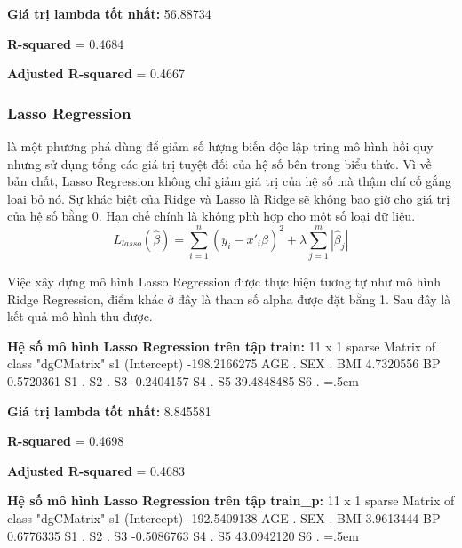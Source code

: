 \documentclass[runningheads]{llncs}
\newenvironment{lcverbatim}
 {\SaveVerbatim{cverb}}
 {\endSaveVerbatim
  \flushleft\fboxrule=0pt\fboxsep=.5em
  \colorbox{cverbbg}{%
    \makebox[\dimexpr\linewidth-2\fboxsep][l]{\BUseVerbatim{cverb}}%
  }
  \endflushleft
}
\begin{document}
\textbf{Giá trị lambda tốt nhất:} 56.88734

\textbf{R-squared} = 0.4684

\textbf{Adjusted R-squared} = 0.4667

\subsubsection{Lasso Regression}
là một phương phá dùng để giảm số lượng biến độc lập tring mô hình hồi quy nhưng sử dụng tổng các giá trị tuyệt đối của hệ số bên trong biểu thức. Vì về bản chất, Lasso Regression không chỉ giảm giá trị của hệ số mà thậm chí cố gắng loại bỏ nó. Sự khác biệt của Ridge và Lasso là Ridge sẽ không bao giờ cho giá trị của hệ số bằng 0. Hạn chế chính là không phù hợp cho một số loại dữ liệu.
	\begin{equation}
	L_{lasso}(\hat{\beta})=\sum^{n}_{i=1}{(y_i-x'_i\hat{\beta})^2}+\lambda\sum^{m}_{j=1}{|\hat{\beta}_j|}
	\end{equation}

Việc xây dựng mô hình Lasso Regression được thực hiện tương tự như mô hình Ridge Regression, điểm khác ở đây là tham số alpha được đặt bằng 1. Sau đây là kết quả mô hình thu được.

\vspace{0.5cm}
\textbf{Hệ số mô hình Lasso Regression trên tập train:}
\begin{lcverbatim}
11 x 1 sparse Matrix of class "dgCMatrix"
                      s1
(Intercept) -198.2166275
AGE            .        
SEX            .        
BMI            4.7320556
BP             0.5720361
S1             .        
S2             .        
S3            -0.2404157
S4             .        
S5            39.4848485
S6             .        
\end{lcverbatim}

\textbf{Giá trị lambda tốt nhất:} 8.845581

\textbf{R-squared} = 0.4698

\textbf{Adjusted R-squared} = 0.4683

\vspace{0.5cm}
\textbf{Hệ số mô hình Lasso Regression trên tập train\_p:}
\begin{lcverbatim}
11 x 1 sparse Matrix of class "dgCMatrix"
                      s1
(Intercept) -192.5409138
AGE            .        
SEX            .        
BMI            3.9613444
BP             0.6776335
S1             .        
S2             .        
S3            -0.5086763
S4             .        
S5            43.0942120
S6             .        
\end{lcverbatim}
\end{document}
